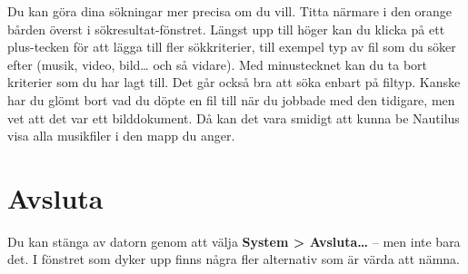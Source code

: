 \documentclass[a4paper,final]{memoir} %
\begin{document}
Du kan göra dina sökningar mer precisa om du vill. Titta närmare i den orange bården överst i sökresultat-fönstret. Längst upp till höger kan du klicka på ett plus-tecken för att lägga till fler sökkriterier, till exempel typ av fil som du söker efter (musik, video, bild\ldots{} och så vidare). Med minustecknet kan du ta bort kriterier som du har lagt till. Det går också bra att söka enbart på filtyp. Kanske har du glömt bort vad du döpte en fil till när du jobbade med den tidigare, men vet att det var ett bilddokument. Då kan det vara smidigt att kunna be Nautilus visa alla musikfiler i den mapp du anger.





\section{Avsluta}


Du kan stänga av datorn genom att välja \textbf{System \textgreater{} Avsluta\ldots{}} -- men inte bara det. I fönstret som dyker upp finns några fler alternativ som är värda att nämna. 
\end{document}
